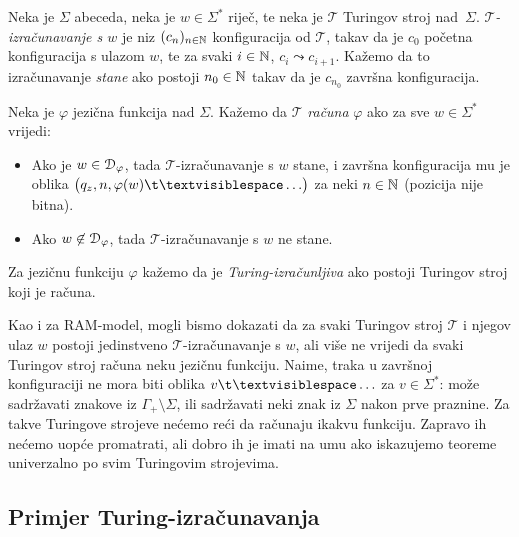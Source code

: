 \begin{definicija}\label{def:Tcomputefi}
Neka je $\Sigma$ abeceda, neka je $w\in\Sigma^*$ riječ, te neka je $\mathcal T$ Turingov stroj nad~$\Sigma$. \emph{$\mathcal T$\!-izračunavanje s $w$} je niz $(c_n)_{n\in{\mathbb N}}$ konfiguracija od $\mathcal T$, takav da je $c_0$ početna konfiguracija s ulazom $w$, te za svaki $i\in{\mathbb N}$, $c_i\leadsto c_{i+1}$. Kažemo da to izračunavanje \emph{stane} ako postoji $n_0\in{\mathbb N}$ takav da je $c_{n_0}$ završna konfiguracija.

Neka je $\varphi$ jezična funkcija nad $\Sigma$. Kažemo da $\mathcal T$ \emph{računa} $\varphi$ ako za sve $w\in\Sigma^*$ vrijedi:
\begin{itemize}
    \item Ako je $w\in\mathcal D_{\varphi}$, tada $\mathcal T$-izračunavanje s $w$ stane, i završna konfiguracija mu je oblika $\bigl(q_z,n,\varphi(w)\bl\ldots\bigr)$ za neki $n\in{\mathbb N}$ (pozicija nije bitna).
    \item Ako $w\not\in\mathcal D_{\varphi}$, tada $\mathcal T$-izračunavanje s $w$ ne stane.
\end{itemize}
Za jezičnu funkciju $\varphi$ kažemo da je \emph{Turing-izračunljiva} ako postoji Turingov stroj koji je računa.
\end{definicija}

Kao i za RAM-model, mogli bismo dokazati da za svaki Turingov stroj $\mathcal T$ i njegov ulaz $w$ postoji jedinstveno $\mathcal T$-izračunavanje s $w$, ali više ne vrijedi da svaki Turingov stroj računa neku jezičnu funkciju. Naime, traka u završnoj konfiguraciji ne mora biti oblika $v\bl\ldots$ za $v\in\Sigma^*$: može sadržavati znakove iz $\Gamma_+\!\setminus\Sigma$, ili sadržavati neki znak iz $\Sigma$ nakon prve praznine. Za takve Turingove strojeve nećemo reći da računaju ikakvu funkciju. Zapravo ih nećemo uopće promatrati, ali dobro ih je imati na umu ako iskazujemo teoreme univerzalno po svim Turingovim strojevima.

\subsection{Primjer Turing-izračunavanja}

